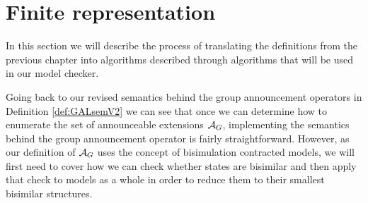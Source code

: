 \section{Finite representation}\label{sec:algorithms}

In this section we will describe the process of translating the definitions from the previous chapter into algorithms described through algorithms that will be used in our model checker. 


Going back to our revised semantics behind the group announcement operators in Definition \ref{def:GALsemV2} we can see that once we can determine how to enumerate the set of announceable extensions $\mathcal{A}_{G}$, implementing the semantics behind the group announcement operator is fairly straightforward. However, as our definition of $\mathcal{A}_{G}$ uses the concept of bisimulation contracted models, we will first need to cover how we can check whether states are bisimilar and then apply that check to models as a whole in order to reduce them to their smallest bisimilar structures. 


